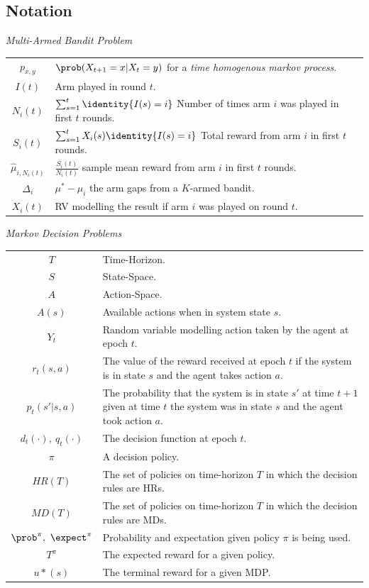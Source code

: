 \documentclass[11pt,a4paper]{article}
\begin{document}
\subsection{Notation}
  \textit{Multi-Armed Bandit Problem}\\
  \begin{tabular}{|c|l|}
    \hline
    $p_{x,y}$&$\prob(X_{t+1}=x|X_{t}=y)$ for a \textit{time homogenous markov process}.\\
    $I(t)$&Arm played in round $t$.\\
    $N_i(t)$&$\sum_{s=1}^t\identity\{I(s)=i\}$ Number of times arm $i$ was played in first $t$ rounds.\\
    $S_i(t)$&$\sum_{s=1}^tX_i(s)\identity\{I(s)=i\}$ Total reward from arm $i$ in first $t$ rounds.\\
    $\hat\mu_{i,N_i(t)}$&$\frac{S_i(t)}{N_i(t)}$ sample mean reward from arm $i$ in first $t$ rounds.\\
    $\Delta_i$&$\mu^*-\mu_i$ the arm gaps from a $K$-armed bandit.\\
    $X_i(t)$&RV modelling the result if arm $i$ was played on round $t$.\\
    \hline
  \end{tabular}

  \textit{Markov Decision Problems}\\
  \begin{tabular}{|c|l|}
    \hline
    $T$&Time-Horizon.\\
    $S$&State-Space.\\
    $A$&Action-Space.\\
    $A(s)$&Available actions when in system state $s$.\\
    $Y_t$&Random variable modelling action taken by the agent at epoch $t$.\\
    $r_t(s,a)$&The value of the reward received at epoch $t$ if the system is in state $s$ and the agent takes action $a$.\\
    $p_t(s'|s,a)$&The probability that the system is in state $s'$ at time $t+1$ given at time $t$ the system was in state $s$ and the agent took action $a$.\\
    $d_t(\cdot),\ q_t(\cdot)$&The decision function at epoch $t$.\\
    $\pi$&A decision policy.\\
    $HR(T)$&The set of policies on time-horizon $T$ in which the decision rules are HRs.\\
    $MD(T)$&The set of policies on time-horizon $T$ in which the decision rules are MDs.\\
    $\prob^\pi,\ \expect^\pi$&Probability and expectation given policy $\pi$ is being used.\\
    $T^\pi$ & The expected reward for a given policy.\\
    $u*(s)$ & The terminal reward for a given MDP.\\
    \hline
  \end{tabular}
\end{document}

